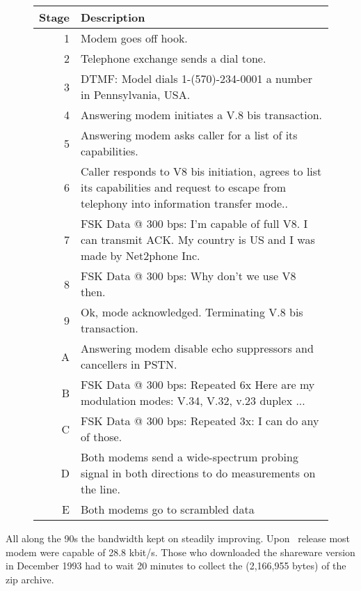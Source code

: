  \begin{figure}[H]
\centering  
\begin{tabularx}{\textwidth}{ R{0.1} L{1.9} }
  \toprule
  \textbf{Stage} &  \textbf{Description} \\
  \toprule 
   
   1 & Modem goes off hook.\\
   2 & Telephone exchange sends a dial tone.\\
   3 & DTMF: Model dials 1-(570)-234-0001 a number in Pennsylvania, USA.\\
   4 & Answering modem initiates a V.8 bis transaction.\\
   5 & Answering modem asks caller for a list of its capabilities.\\
   6 & Caller responds to V8 bis initiation, agrees to list its capabilities and request to escape from telephony into information transfer mode..\\
   7 & FSK Data @ 300 bps: I'm capable of full V8. I can transmit ACK. My country is US and I was made by Net2phone Inc.\\
   8 & FSK Data @ 300 bps: Why don't we use V8 then.\\
   9 & Ok, mode acknowledged. Terminating V.8 bis transaction.\\
   \toprule 
   A & Answering modem disable echo suppressors and cancellers in PSTN.\\
   B & FSK Data @ 300 bps: Repeated 6x Here are my modulation modes: V.34, V.32, v.23 duplex ...\\
   C & FSK Data @ 300 bps: Repeated 3x: I can do any of those. \\
   D & Both modems send a wide-spectrum probing signal in both directions to do measurements on the line.\\
   E & Both modems go to scrambled data \\
   \toprule
\end{tabularx}
\caption{}
\end{figure}
\par




All along the 90s the bandwidth kept on steadily improving. Upon \doom~release most modem were capable of 28.8 kbit/s. Those who downloaded the shareware version in December 1993 had to wait 20 minutes to collect the (2,166,955 bytes) of the zip archive.\\
\par

